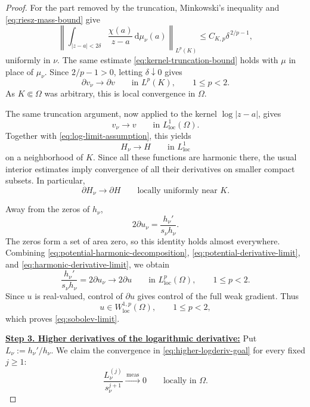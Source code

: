 \documentclass[12pt,letterpaper,reqno]{amsart}
\theoremstyle{definition}
\numberwithin{equation}{section}
\newcommand{\loc}{\mathrm{loc}}
\newcommand{\convmeas}{\xrightarrow{\,\mathrm{meas}\,}}
\begin{document}
\begin{proof}
For the part removed by the truncation, Minkowski's inequality and
\eqref{eq:riesz-mass-bound} give
\begin{equation}\label{eq:kernel-truncation-bound}
 \left\|
 \int_{|z-a|<2\delta}
 \frac{\chi(a)}{z-a}\,\mathrm d\mu_\nu(a)
 \right\|_{L^p(K)}
 \leq C_{K,p}\delta^{\,2/p-1},
\end{equation}
uniformly in \(\nu\). The same estimate
\eqref{eq:kernel-truncation-bound} holds with \(\mu\) in place of
\(\mu_\nu\). Since \(2/p-1>0\), letting
\(\delta\downarrow0\) gives
\begin{equation}\label{eq:potential-derivative-limit}
 \partial v_\nu\longrightarrow\partial v
 \qquad\text{in }L^p(K),
 \qquad 1\leq p<2.
\end{equation}
As \(K\Subset\Omega\) was arbitrary, this is local convergence in
\(\Omega\).

The same truncation argument, now applied to the kernel
\(\log|z-a|\), gives
\[
v_\nu\longrightarrow v
\qquad\text{in }L^1_{\loc}(\Omega).
\]
Together with \eqref{eq:log-limit-assumption}, this yields
\begin{equation}\label{eq:harmonic-part-limit}
 H_\nu\longrightarrow H
 \qquad\text{in }L^1_{\loc}
\end{equation}
on a neighborhood of \(K\). Since all these functions are harmonic
there, the usual interior estimates imply convergence of all their
derivatives on smaller compact subsets. In particular,
\begin{equation}\label{eq:harmonic-derivative-limit}
 \partial H_\nu\longrightarrow\partial H
 \qquad\text{locally uniformly near }K.
\end{equation}

Away from the zeros of \(h_\nu\),
\[
2\partial u_\nu
 =
 \frac{h_\nu'}{s_\nu h_\nu}.
\]
The zeros form a set of area zero, so this identity holds almost
everywhere. Combining
\eqref{eq:potential-harmonic-decomposition},
\eqref{eq:potential-derivative-limit}, and
\eqref{eq:harmonic-derivative-limit}, we obtain
\begin{equation}\label{eq:first-logderiv-limit}
 \frac{h_\nu'}{s_\nu h_\nu}
 =
 2\partial u_\nu
 \longrightarrow
 2\partial u
 \qquad\text{in }L^p_{\loc}(\Omega),
 \qquad 1\leq p<2.
\end{equation}
Since \(u\) is real-valued, control of \(\partial u\) gives control of
the full weak gradient. Thus
\[
u\in W^{1,p}_{\loc}(\Omega),
\qquad
1\leq p<2,
\]
which proves \eqref{eq:sobolev-limit}.

\medskip\noindent
\textbf{\underline{Step 3. Higher derivatives of the logarithmic derivative:}}
Put $
L_\nu:={h_\nu'}/{h_\nu}.$
We claim the convergence in \eqref{eq:higher-logderiv-goal} for every
fixed \(j\geq1\):
\begin{equation}\label{eq:higher-logderiv-goal}
 \frac{L_\nu^{(j)}}{s_\nu^{j+1}}
 \convmeas0
 \qquad\text{locally in }\Omega.
\end{equation}


\end{proof}
\end{document}
